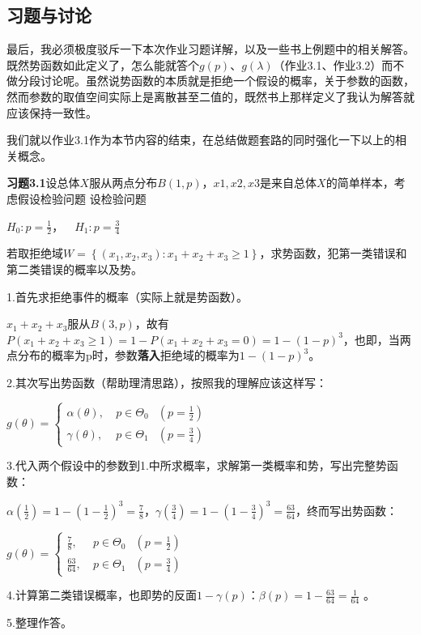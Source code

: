 \documentclass[10pt, a4paper]{article}
\begin{document}
\subsection{习题与讨论}
最后，我必须极度驳斥一下本次作业习题详解，以及一些书上例题中的相关解答。既然势函数如此定义了，怎么能就答个$g(p)$、$g(\lambda)$（作业3.1、作业3.2）而不做分段讨论呢。虽然说势函数的本质就是拒绝一个假设的概率，关于参数的函数，然而参数的取值空间实际上是离散甚至二值的，既然书上那样定义了我认为解答就应该保持一致性。\par
我们就以作业3.1作为本节内容的结束，在总结做题套路的同时强化一下以上的相关概念。\par
\textbf{习题3.1}设总体$X$服从两点分布$B(1,p)$，$x1,x2,x3$是来自总体$X$的简单样本，考虑假设检验问题
设检验问题
\begin{center}
    $H_0:p=\frac{1}{2}$，~~$H_1:p=\frac{3}{4}$
\end{center} 
若取拒绝域$W=\left\{\left(x_{1}, x_{2}, x_{3}\right): x_{1}+x_{2}+x_{3} \geqslant 1\right\}$，求势函数，犯第一类错误和第二类错误的概率以及势。\\\par
1.首先求拒绝事件的概率（实际上就是势函数）。\par
$x_{1}+x_{2}+x_{3}$服从$B(3,p)$，故有$P(x_{1}+x_{2}+x_{3} \geqslant 1) = 1-P(x_{1}+x_{2}+x_{3} = 0)=1-(1-p)^3$，也即，当两点分布的概率为p时，参数\textbf{落入}拒绝域的概率为$1-(1-p)^3$。\par
2.其次写出势函数（帮助理清思路），按照我的理解应该这样写：\par
\begin{center}
    $
    g(\theta)=\left\{
    \begin{aligned}
    \alpha(\theta),~ & p \in \Theta_{0} & (p=\frac{1}{2}) \\
    \gamma(\theta),~ & p \in \Theta_{1} & (p=\frac{3}{4})
    \end{aligned}\right.$
\end{center} \par
3.代入两个假设中的参数到1.中所求概率，求解第一类概率和势，写出完整势函数：\par $\alpha(\frac{1}{2}) = 1-(1-\frac{1}{2})^3 = \frac{7}{8}$，$\gamma(\frac{3}{4}) = 1-(1-\frac{3}{4})^3 = \frac{63}{64}$，终而写出势函数：
\begin{center}
    $
    g(\theta)=\left\{
    \begin{aligned}
    \frac{7}{8},~ & p \in \Theta_{0} & (p=\frac{1}{2}) \\
    \frac{63}{64},~ & p \in \Theta_{1} & (p=\frac{3}{4})
    \end{aligned}\right.$
\end{center} \par
4.计算第二类错误概率，也即势的反面$1-\gamma(p)$：$\beta(p)=1-\frac{63}{64} = \frac{1}{64}$ 。\par
5.整理作答。
\end{document}
